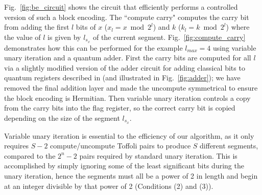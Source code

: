 \documentclass[aps,prx,twocolumn,floatfix,10pt,amssymb,amsfont,amsmath,superscriptaddress,float,nofootinbib,longbibliography,nobalancelastpage]{revtex4-2}
\theoremstyle{empty}
\begin{document}
Fig.~\ref{fig:be_circuit} shows the circuit that efficiently performs a controlled version of such a block encoding. The ``compute carry" computes the carry bit from adding the first $l$ bits of $x$ ($x_l = x \bmod 2^{l}$) and $k$ ($k_l = k \bmod 2^{l}$) where the value of $l$ is given by $l_{s_x}$ of the current segment. Fig.~\ref{fig:compute_carry} demonstrates how this can be performed for the example $l_{max} =4$ using variable unary iteration and a quantum adder. First the carry bits are computed for all $l$ via a slightly modified version of the adder circuit for adding classical bits to quantum registers described in \cite{Sanders_2020} (and illustrated in Fig.~\ref{fig:adder}); we have removed the final addition layer and made the uncompute symmetrical to ensure the block encoding is Hermitian. Then variable unary iteration \cite{Sanders_2020} controls a copy from the carry bits into the flag register, so the correct carry bit is copied depending on the size of the segment $l_{s_x}$. 

Variable unary iteration is essential to the efficiency of our algorithm, as it only requires $S-2$ compute/uncompute Toffoli pairs to produce $S$ different segments, compared to the $2^n-2$ pairs required by standard unary iteration. This is accomplished by simply ignoring some of the least significant bits during the unary iteration, hence the segments must all be a power of 2 in length and begin at an integer divisible by that power of 2 (Conditions (2) and (3)).
\end{document}

